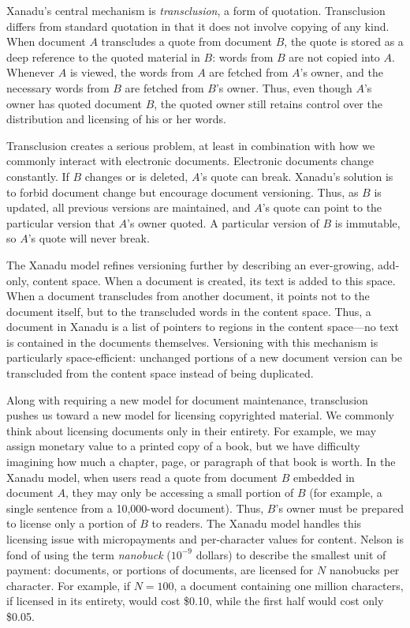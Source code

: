 \documentclass{acm_proc_article-sp}
\begin{document}
Xanadu's central mechanism is {\it transclusion}, a form of quotation.  
Transclusion differs from standard quotation in that it does not involve copying of any kind.  
When document $A$ transcludes a quote from document $B$, the quote is stored as a deep reference to the quoted material in $B$:  words from $B$ are not copied into $A$. 
Whenever $A$ is viewed, the words from $A$ are fetched from $A$'s owner, and the necessary words from $B$ are fetched from $B$'s owner.
Thus, even though $A$'s owner has quoted document $B$, the quoted owner still retains control over the distribution and licensing of his or her words.

Transclusion creates a serious problem, at least in combination with how we commonly interact with electronic documents.
Electronic documents change constantly.
If $B$ changes or is deleted, $A$'s quote can break.
Xanadu's solution is to forbid document change but encourage document versioning.
Thus, as $B$ is updated, all previous versions are maintained, and $A$'s quote can point to the particular version that $A$'s owner quoted.
A particular version of $B$ is immutable, so $A$'s quote will never break.

The Xanadu model refines versioning further by describing an ever-growing, add-only, content space.  
When a document is created, its text is added to this space.
When a document transcludes from another document, it points not to the document itself, but to the transcluded words in the content space.
Thus, a document in Xanadu is a list of pointers to regions in the content space---no text is contained in the documents themselves.
Versioning with this mechanism is particularly space-efficient:  unchanged portions of a new document version can be transcluded from the content space instead of being duplicated.

Along with requiring a new model for document maintenance, transclusion pushes us toward a new model for licensing copyrighted material.
We commonly think about licensing documents only in their entirety.
For example, we may assign monetary value to a printed copy of a book, but we have difficulty imagining how much a chapter, page, or paragraph of that book is worth.
In the Xanadu model, when users read a quote from document $B$ embedded in document $A$, they may only be accessing a small portion of $B$ (for example, a single sentence from a 10,000-word document).
Thus, $B$'s owner must be prepared to license only a portion of $B$ to readers.
The Xanadu model handles this licensing issue with micropayments and per-character values for content.
Nelson is fond of using the term {\it nanobuck} ($10^{-9}$ dollars) to describe the smallest unit of payment:  documents, or portions of documents, are licensed for $N$ nanobucks per character.
For example, if $N=100$, a document containing one million characters, if licensed in its entirety, would cost \$0.10, while the first half would cost only \$0.05.
\end{document}
